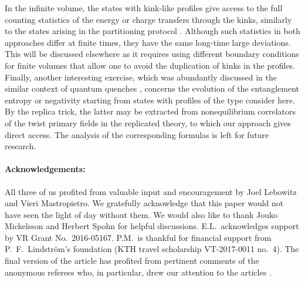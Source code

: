 \documentclass[12pt,a4paper]{article}
\theoremstyle{definition}
\theoremstyle{remark}
\begin{document}
In the infinite volume, the states with kink-like profiles 
give access to the full counting statistics of the 
energy or charge transfers through the kinks, similarly to the states 
arising in the partitioning protocol \cite{BeDo3}.
Although such statistics in both approaches differ at finite times, they 
have the same long-time large deviations.
This will be discussed elsewhere as it requires using different boundary 
conditions for finite volumes that allow one to avoid the duplication 
of kinks in the profiles.
Finally, another interesting exercise, which was abundantly discussed 
in the similar context of quantum quenches \cite{CaCa2}, concerns the 
evolution of the entanglement entropy or negativity starting from states 
with profiles of the type consider here.
By the replica trick, the latter may be extracted from nonequilibrium 
correlators of the twist primary fields in the replicated theory, to 
which our approach gives direct access.
The analysis of the corresponding formulas is left for future research.

\paragraph{Acknowledgements:}
All three of us profited from valuable input and encouragement by Joel Lebowitz
and Vieri Mastropietro. We gratefully acknowledge that this paper would
not have seen the light of day without them. We would also like to thank Jouko
Mickelsson and Herbert Spohn for helpful discussions. E.L.\ acknowledges
support by VR Grant No.\ 2016-05167. P.M.\ is thankful for financial support
from P.\ F.\ Lindstr{\"o}m's foundation (KTH travel scholarship VT-2017-0011
no.\ 4). The final version of the article has profited from pertinent
comments of the anonymous referees who, in particular, drew our attention to
the articles \cite{DSVC,BD1,DSC,BD2}.

\end{document}
